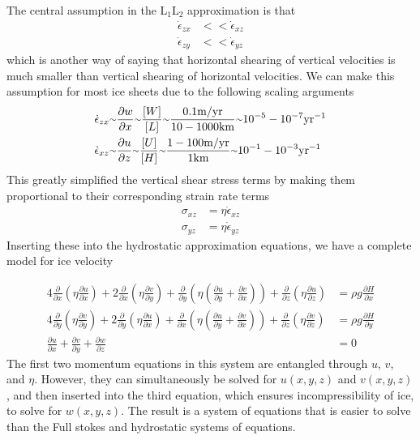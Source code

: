 \documentclass[12pt]{article}
\theoremstyle{definition}
\newcommand{\pd}[2]{\frac{\partial {#1}}{\partial {#2}}}
\newcommand{\mytilde}{\raise.17ex\hbox{$\scriptstyle\mathtt{\sim}$}}
\begin{document}
The central assumption in the L$_1$L$_2$ approximation is that
\begin{align}
\dot{\epsilon}_{zx} &<< \dot{\epsilon}_{xz} \\
\dot{\epsilon}_{zy} &<< \dot{\epsilon}_{yz}
\end{align}
which is another way of saying that horizontal shearing of vertical velocities is much smaller than vertical shearing of horizontal velocities. We can make this assumption for most ice sheets due to the following scaling arguments
\begin{align}
\dot{\epsilon}_{zx} &\mytilde \pd{w}{x} \mytilde \frac{[W]}{[L]} \mytilde \frac{0.1 \space \text{m/yr}}{10-1000 \space \text{km}} \mytilde 10^{-5} - 10^{-7} \space \text{yr}^{-1} \\ \dot{\epsilon}_{xz} &\mytilde \pd{u}{z} \mytilde \frac{[U]}{[H]} \mytilde \frac{1-100 \space \text{m/yr}}{1 \space \text{km}} \mytilde 10^{-1} - 10^{-3} \space \text{yr}^{-1}
\end{align}
This greatly simplified the vertical shear stress terms by making them proportional to their corresponding strain rate terms
\begin{align}
\sigma_{xz} &= \eta \dot{\epsilon}_{xz} \\
\sigma_{yz} &= \eta \dot{\epsilon}_{yz}
\end{align}
Inserting these into the hydrostatic approximation equations, we have a complete model for ice velocity
\begin{shaded}
\begin{align}
4 \pd{}{x} \left(\eta \pd{u}{x} \right) + 2 \pd{}{x} \left(\eta \pd{v}{y} \right) + \pd{}{y} \left(\eta \left(\pd{u}{y} + \pd{v}{x} \right) \right) + \pd{}{z} \left( \eta \pd{u}{z} \right) &= \rho g \pd{H}{x} \\
4 \pd{}{y} \left(\eta \pd{v}{y} \right) + 2 \pd{}{y} \left(\eta \pd{u}{x} \right) + \pd{}{x} \left(\eta \left(\pd{u}{y} + \pd{v}{x} \right) \right) + \pd{}{z} \left( \eta \pd{v}{z} \right) &= \rho g \pd{H}{y} \\
\pd{u}{x} + \pd{v}{y} + \pd{w}{z} &= 0
\end{align}
The first two momentum equations in this system are entangled through $u$, $v$, and $\eta$. However, they can simultaneously be solved for $u(x,y,z)$ and $v(x,y,z)$, and then inserted into the third equation, which ensures incompressibility of ice, to solve for $w(x,y,z)$. The result is a system of equations that is easier to solve than the Full stokes and hydrostatic systems of equations.
\end{shaded}
\end{document}
